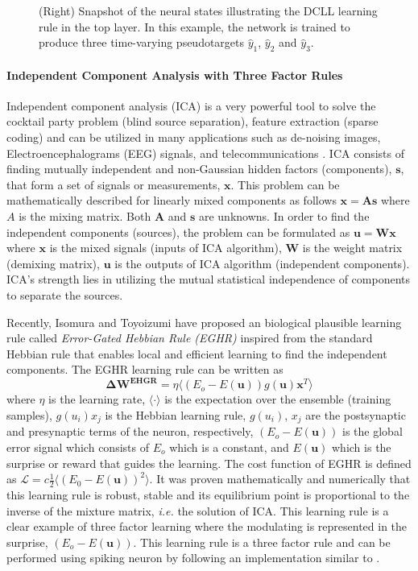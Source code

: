 \documentclass[english]{article}
\renewcommand{\cite}{\citep}
\begin{document}
\begin{figure}
{  (Right) Snapshot of the neural states illustrating the DCLL learning rule in the top layer. In this example, the network is trained to produce three time-varying pseudotargets $\hat{y}_1$, $\hat{y}_2$ and $\hat{y}_3$.}
\end{figure}
%

\paragraph{Independent Component Analysis with Three Factor Rules }
Independent component analysis (ICA) is a very powerful tool to solve the cocktail party problem (blind source separation), feature extraction (sparse coding) and can be utilized in many applications such as de-noising images, Electroencephalograms (EEG) signals, and telecommunications \cite{hyvarinen2004independent}. ICA consists of finding mutually independent and non-Gaussian hidden factors (components), $\mathbf{s}$, that form a set of signals or measurements, $\mathbf{x}$. This problem can be mathematically described for linearly mixed components as follows  
$\mathbf{x}=\mathbf{A}\mathbf{s}$ where $A$ is the mixing matrix. Both $\mathbf{A}$ and $\mathbf{s}$ are unknowns. {In order to find the independent components (sources), the problem can be formulated as $\mathbf{u}=\mathbf{W}\mathbf{x}$ where $\mathbf{x}$ is the mixed signals (inputs of ICA algorithm), $\mathbf{W}$ is the weight matrix (demixing matrix), $\mathbf{u}$ is the outputs of ICA algorithm (independent components).} ICA's strength lies in  utilizing the mutual statistical independence of components to separate the sources. 

Recently, Isomura and Toyoizumi have proposed an biological plausible learning rule called \textit{Error-Gated Hebbian Rule (EGHR)} inspired from the standard Hebbian rule \cite{isomura2016local} that enables local and efficient learning to find the independent components. The EGHR learning rule can be written as 
\begin{equation}
\mathbf{\Delta{W}^{EHGR}}=\eta \langle\left(E_o-E(\mathbf{u})\right)g(\mathbf{u})\mathbf{x}^T\rangle
\end{equation}
\noindent where $\eta$ is the learning rate, $\langle\cdot\rangle$ is the expectation over the ensemble (training samples), $g(u_i)x_j$ is the Hebbian learning rule, $g(u_i)$, $x_j$ are the postsynaptic and presynaptic terms of the neuron, respectively, $(E_o-E(\mathbf{u}))$ is the global error signal which consists of $E_o$ which is a constant, and $E(\mathbf{u})$ which is the surprise or reward that guides the learning. The cost function of EGHR is defined as $\mathcal{L}=c\frac12\langle(E_0-E(\mathbf{u}))^2\rangle$. It was proven mathematically and numerically that this learning rule is robust, stable and its equilibrium point is proportional to the inverse of the mixture matrix, \emph{i.e.} the solution of ICA. This learning rule is a clear example of three factor learning where the modulating is represented in the surprise,  $\left(E_o-E(\mathbf{u})\right)$. 
This learning rule is a three factor rule and can be performed using spiking neuron by following an implementation similar to  \cite{savin2010independent}.
\end{document}
